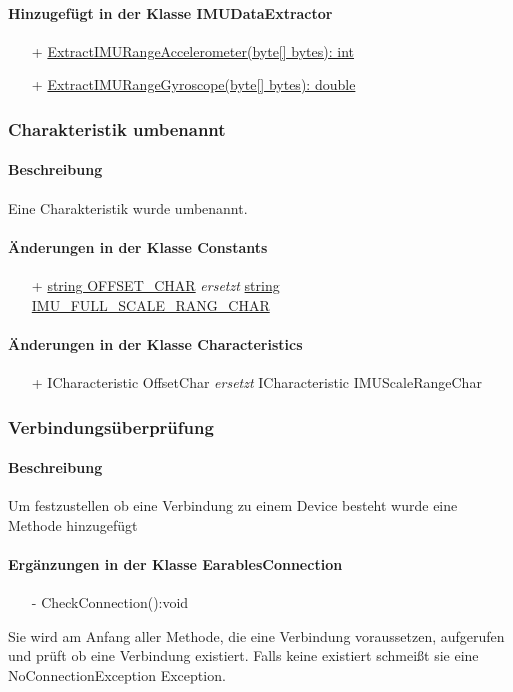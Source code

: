 \documentclass[a4paper,12pt]{article}
\begin{document}
\paragraph{Hinzugefügt in der Klasse IMUDataExtractor}
\begin{itemize}
  \item[+] \underline{ExtractIMURangeAccelerometer(byte[] bytes): int} 
	\item[+] \underline{ExtractIMURangeGyroscope(byte[] bytes): double} 
\end{itemize}
\subsubsection{Charakteristik umbenannt}
\paragraph{Beschreibung}
Eine Charakteristik wurde umbenannt.
\paragraph{Änderungen in der Klasse Constants}
\begin{itemize}
	\item[+] \underline{string OFFSET\_CHAR} \textit{ersetzt} \underline{ string IMU\_FULL\_SCALE\_RANG\_CHAR} 
\end{itemize}
\paragraph{Änderungen in der Klasse Characteristics}
\begin{itemize}
	\item[+] ICharacteristic OffsetChar \textit{ersetzt} ICharacteristic IMUScaleRangeChar
\end{itemize}

\subsubsection{Verbindungsüberprüfung}
\paragraph{Beschreibung}
Um festzustellen ob eine Verbindung zu einem Device besteht wurde eine Methode hinzugefügt
\paragraph{Ergänzungen in der Klasse EarablesConnection}
\begin{itemize}
	\item[-]  CheckConnection():void  
\end{itemize}
Sie wird am Anfang aller  Methode, die eine Verbindung voraussetzen, aufgerufen und prüft ob eine Verbindung existiert. Falls keine existiert schmeißt sie eine NoConnectionException Exception.
\end{document}
